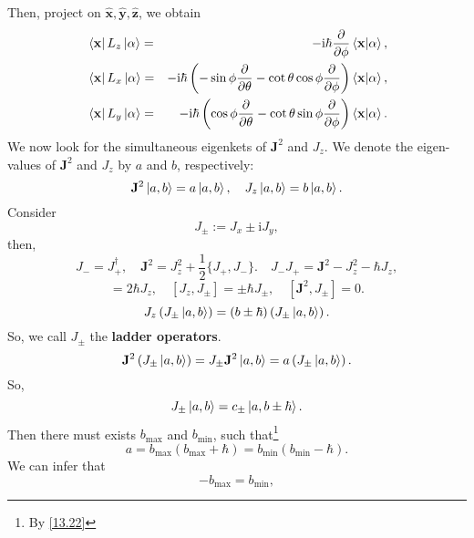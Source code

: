 \documentclass{article}
\theoremstyle{1}
\newcommand{\ii}{\mathrm{i}}
\begin{document}
Then, project on $\hat{\mathbf{x}},\hat{\mathbf{y}},\hat{\mathbf{z}}$, we obtain
\begin{eqnarray}
    &\bra{\mathbf{x}}L_z\ket{\alpha}=&-\ii \hbar \pdv{\phi}\braket{\mathbf{x}}{\alpha},\\
    &\bra{\mathbf{x}}L_x\ket{\alpha}=&-\ii \hbar \left(-\sin \phi \pdv{\theta}-\cot\theta\cos\phi \pdv{\phi}\right)\braket{\mathbf{x}}{\alpha},\\
    &\bra{\mathbf{x}}L_y\ket{\alpha}=&-\ii \hbar \left(\cos \phi \pdv{\theta}-\cot\theta\sin\phi \pdv{\phi}\right)\braket{\mathbf{x}}{\alpha}.
\end{eqnarray}
We now look for the simultaneous eigenkets of $\mathbf{J}^2$ and $J_z$. We denote the eigen-values of $\mathbf{J}^2$ and $J_z$ by $a$ and $b$, respectively:
\begin{equation}
    \mathbf{J}^2\ket{a,b}=a\ket{a,b},\quad J_z\ket{a,b}=b\ket{a,b}.
\end{equation}
Consider
\begin{equation}
    J_\pm:=J_x\pm \ii  J_y,
\end{equation}
then, 
\begin{equation}\label{13.22}
    J_-=J_+^\dagger, \quad \mathbf{J}^2=J_z^2+\frac{1}{2}\{J_+,J_-\}.\quad J_-J_+ =\mathbf{J}^2- J_z^2 -\hbar J_z,
\end{equation}
\begin{equation}
    [J_+,J_-]=2\hbar J_z,\quad [J_z,J_\pm]=\pm\hbar J_\pm,\quad [\mathbf{J}^2,J_\pm]=0.
\end{equation}
\begin{equation}
    J_z\left(J_\pm\ket{a,b}\right)=\left(b\pm\hbar\right)\left( J_\pm\ket{a,b}\right).
\end{equation}
So, we call $J_\pm$ the \textbf{ladder operators}.
\begin{equation}
    \mathbf{J}^2\left(J_\pm\ket{a,b}\right)=J_\pm \mathbf{J}^2\ket{a,b}=a\left(J_\pm\ket{a,b}\right).
\end{equation}
So, 
\begin{equation}
    J_\pm\ket{a,b}=c_\pm\ket{a,b\pm \hbar}.
\end{equation}
Then there must exists $b_\mathrm{max}$ and $b_\mathrm{min}$, such that\footnote{By \eqref{13.22}} 
\begin{equation}
    a=b_\mathrm{max}\left(b_\mathrm{max}+\hbar\right)=b_\mathrm{min}\left(b_\mathrm{min}-\hbar\right).
\end{equation}
We can infer that 
\begin{equation}
   - b_\mathrm{max}=b_\mathrm{min},
\end{equation}
\end{document}
